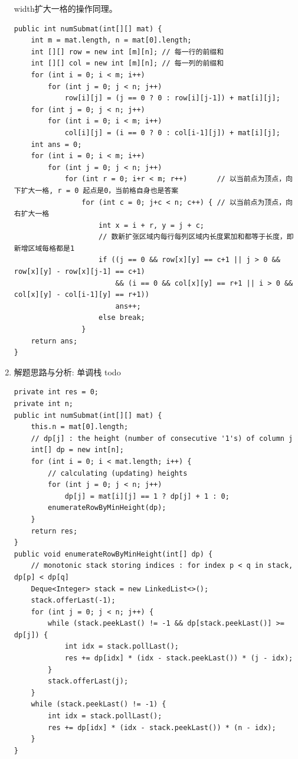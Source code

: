 \documentclass[9pt, b5paaper]{book}
\begin{document}
\begin{enumerate}
width扩大一格的操作同理。
\begin{verbatim}
public int numSubmat(int[][] mat) {
    int m = mat.length, n = mat[0].length;
    int [][] row = new int [m][n]; // 每一行的前缀和
    int [][] col = new int [m][n]; // 每一列的前缀和
    for (int i = 0; i < m; i++)
        for (int j = 0; j < n; j++) 
            row[i][j] = (j == 0 ? 0 : row[i][j-1]) + mat[i][j];
    for (int j = 0; j < n; j++) 
        for (int i = 0; i < m; i++) 
            col[i][j] = (i == 0 ? 0 : col[i-1][j]) + mat[i][j];
    int ans = 0;
    for (int i = 0; i < m; i++) 
        for (int j = 0; j < n; j++) 
            for (int r = 0; i+r < m; r++)       // 以当前点为顶点，向下扩大一格, r = 0 起点是0，当前格自身也是答案
                for (int c = 0; j+c < n; c++) { // 以当前点为顶点，向右扩大一格
                    int x = i + r, y = j + c;
                    // 数新扩张区域内每行每列区域内长度累加和都等于长度，即新增区域每格都是1
                    if ((j == 0 && row[x][y] == c+1 || j > 0 && row[x][y] - row[x][j-1] == c+1)
                        && (i == 0 && col[x][y] == r+1 || i > 0 && col[x][y] - col[i-1][y] == r+1))
                        ans++;
                    else break;
                }
    return ans;
}
\end{verbatim}
\item 解题思路与分析: 单调栈 todo
\label{sec-1-5-4-2}
\begin{verbatim}
private int res = 0;
private int n;
public int numSubmat(int[][] mat) {
    this.n = mat[0].length;
    // dp[j] : the height (number of consecutive '1's) of column j 
    int[] dp = new int[n];
    for (int i = 0; i < mat.length; i++) {
        // calculating (updating) heights
        for (int j = 0; j < n; j++) 
            dp[j] = mat[i][j] == 1 ? dp[j] + 1 : 0;
        enumerateRowByMinHeight(dp);
    }
    return res;
}
public void enumerateRowByMinHeight(int[] dp) {
    // monotonic stack storing indices : for index p < q in stack, dp[p] < dp[q]
    Deque<Integer> stack = new LinkedList<>();
    stack.offerLast(-1);
    for (int j = 0; j < n; j++) {
        while (stack.peekLast() != -1 && dp[stack.peekLast()] >= dp[j]) {
            int idx = stack.pollLast();
            res += dp[idx] * (idx - stack.peekLast()) * (j - idx);
        }
        stack.offerLast(j);
    }
    while (stack.peekLast() != -1) {
        int idx = stack.pollLast();
        res += dp[idx] * (idx - stack.peekLast()) * (n - idx);
    }
}
\end{verbatim}

\end{enumerate}
\end{document}
